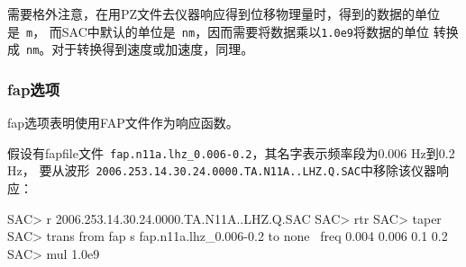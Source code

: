 需要格外注意，在用PZ文件去仪器响应得到位移物理量时，得到的数据的单位是~\verb+m+，
而SAC中默认的单位是~\verb+nm+，因而需要将数据乘以\verb+1.0e9+将数据的单位
转换成~\verb+nm+。对于转换得到速度或加速度，同理。

\subsubsection{fap选项}
fap选项表明使用FAP文件作为响应函数。

假设有fapfile文件~\verb+fap.n11a.lhz_0.006-0.2+，其名字表示频率段为0.006 Hz到0.2 Hz，
要从波形~\verb+2006.253.14.30.24.0000.TA.N11A..LHZ.Q.SAC+中移除该仪器响应：
\begin{SACCode}
SAC> r 2006.253.14.30.24.0000.TA.N11A..LHZ.Q.SAC
SAC> rtr
SAC> taper
SAC> trans from fap s fap.n11a.lhz_0.006-0.2 to none \
                        freq 0.004 0.006 0.1 0.2
SAC> mul 1.0e9
\end{SACCode}
